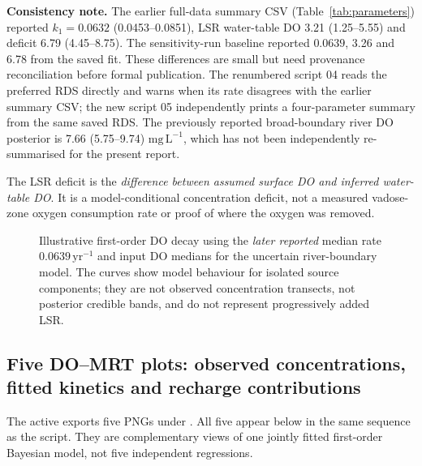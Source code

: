\documentclass[11pt,a4paper]{article}
\newcommand{\mgL}{\mathrm{mg\,L^{-1}}}
\newcommand{\yr}{\mathrm{yr}}
\begin{document}
\textbf{Consistency note.} The earlier full-data summary CSV (Table~\ref{tab:parameters}) reported $k_1=0.0632$ (0.0453--0.0851), LSR water-table DO 3.21 (1.25--5.55) and deficit 6.79 (4.45--8.75). The sensitivity-run baseline reported $0.0639$, 3.26 and 6.78 from the saved fit. These differences are small but need provenance reconciliation before formal publication. The renumbered script 04 reads the preferred RDS directly and warns when its rate disagrees with the earlier summary CSV; the new script 05 independently prints a four-parameter summary from the same saved RDS. The previously reported broad-boundary river DO posterior is 7.66 (5.75--9.74) $\mgL$, which has not been independently re-summarised for the present report.

The LSR deficit is the \emph{difference between assumed surface DO and inferred water-table DO}. It is a model-conditional concentration deficit, not a measured vadose-zone oxygen consumption rate or proof of where the oxygen was removed.

\begin{figure}[htbp]
\centering
{}
\caption{Illustrative first-order DO decay using the \emph{later reported} median rate $0.0639\,\yr^{-1}$ and input DO medians for the uncertain river-boundary model. The curves show model behaviour for isolated source components; they are not observed concentration transects, not posterior credible bands, and do not represent progressively added LSR.}
\label{fig:decay}
\end{figure}

\subsection{Five DO--MRT plots: observed concentrations, fitted kinetics and recharge contributions}
\label{sec:fiveplots}
The active  exports five PNGs under . All five appear below in the same sequence as the script. They are complementary views of one jointly fitted first-order Bayesian model, not five independent regressions.
\end{document}

